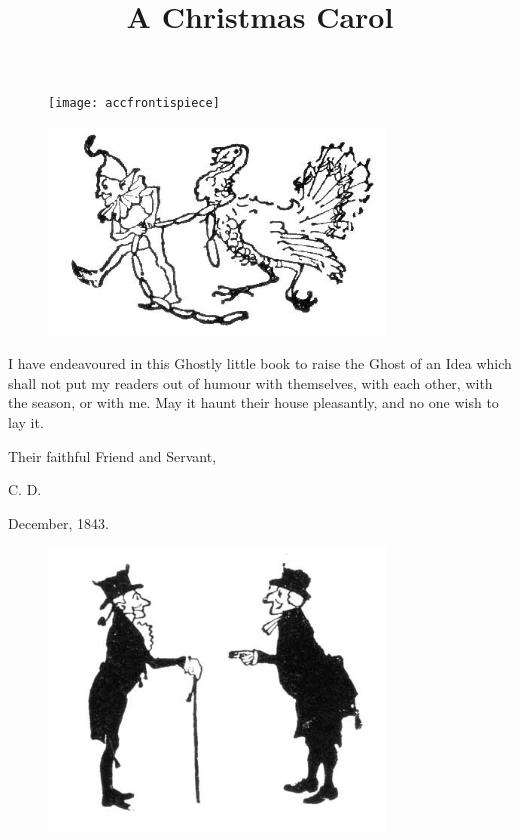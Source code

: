 \documentclass[paper=5.5in:8.5in,BCOR=15mm,twoside,DIV=15,headinclude=off,12pt,chapterprefix=off,openany,headings=huge]{scrbook} %
\begin{document}
\renewcommand*{\sectionmarkformat}{}
\renewcommand*\raggedchapter{\centering}
\pagestyle{empty}
\begin{figure}[p]
\begin{minipage}[c]{\linewidth}
\texttt{[image: accfrontispiece]}
\end{minipage}
\end{figure}
\title{A Christmas Carol}



\renewcommand*{\chapterpagestyle}{empty}
\tableofcontents
\begin{figure}
\centering
\includegraphics[width=0.8\textwidth]{gs011}
\end{figure}
\clearpage
\pagestyle{headings}
\renewcommand*{\chapterpagestyle}{plain}

\lettrine[loversize=.85]{I}{} have endeavoured in this Ghostly little book to raise the Ghost of an Idea which shall not put my readers out of humour with themselves, with each other, with the season, or with me. May it haunt their house pleasantly, and no one wish to lay it.

Their faithful Friend and Servant,

C. D.

December, 1843.
\begin{figure}[h]
\centering
\includegraphics[width=0.8\textwidth]{gs007}
\end{figure}
\end{document}
